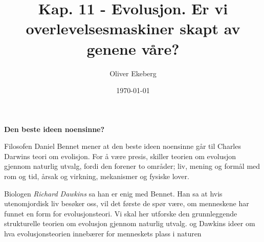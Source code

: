\documentclass[11pt, a4paper]{article}
\title{Kap. 11 - Evolusjon. Er vi overlevelsesmaskiner skapt av genene våre?}
\author{Oliver Ekeberg}
\date{\today}
\newenvironment{sectionbox}[1][]{%
    \begin{sectionboxinner}
    \textbf{\large #1}
    \vspace{1pt}
    \newline
}{%
    \end{sectionboxinner}
}
\begin{document}
\maketitle

\tableofcontents

\begin{sectionbox}[Den beste ideen noensinne?]

\begin{flushleft}
    Filosofen Daniel Bennet mener at den beste ideen noensinne går til Charles Darwins teori om evolisjon. For å være presis, skiller teorien om evolusjon gjennom naturlig utvalg, fordi den forener to områder; liv, mening og formål med rom og tid, årsak og virkning, mekanismer og fysiske lover.
\end{flushleft}

\begin{flushleft}
    Biologen \textit{Richard Dawkins} sa han er enig med Bennet. Han sa at hvis utenomjordisk liv besøker oss, vil det første de spør være, om menneskene har funnet en form for evolusjonsteori. Vi skal her utforske den grunnleggende strukturelle teorien om evolusjon gjennom naturlig utvalg. og Dawkins ideer om hva evolusjonsteorien innebærer for menneskets plass i naturen
\end{flushleft}
\end{sectionbox}
\end{document}
